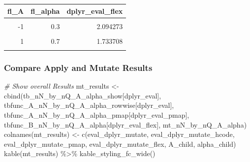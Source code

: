 \documentclass[
]{book}
\newenvironment{Shaded}{\begin{snugshade}}{\end{snugshade}}
\newcommand{\CommentTok}[1]{\textcolor[rgb]{0.56,0.35,0.01}{\textit{#1}}}
\newcommand{\FunctionTok}[1]{\textcolor[rgb]{0.00,0.00,0.00}{#1}}
\newcommand{\NormalTok}[1]{#1}
\newcommand{\OtherTok}[1]{\textcolor[rgb]{0.56,0.35,0.01}{#1}}
\newcommand{\SpecialCharTok}[1]{\textcolor[rgb]{0.00,0.00,0.00}{#1}}
\newcommand{\StringTok}[1]{\textcolor[rgb]{0.31,0.60,0.02}{#1}}
\begin{document}
\begin{table}[!h]
\centering
\begin{tabular}{r|r|r}
\hline
fl\_A & fl\_alpha & dplyr\_eval\_flex\\
\hline
\cellcolor{gray!6}{-2} & \cellcolor{gray!6}{0.1} & \cellcolor{gray!6}{2.346356}\\
\hline
-1 & 0.3 & 2.094273\\
\hline
\cellcolor{gray!6}{0} & \cellcolor{gray!6}{0.5} & \cellcolor{gray!6}{1.895316}\\
\hline
1 & 0.7 & 1.733708\\
\hline
\cellcolor{gray!6}{2} & \cellcolor{gray!6}{0.9} & \cellcolor{gray!6}{1.599477}\\
\hline
\end{tabular}
\end{table}

\hypertarget{compare-apply-and-mutate-results}{%
\subsubsection{Compare Apply and Mutate Results}\label{compare-apply-and-mutate-results}}

\begin{Shaded}
\begin{Highlighting}[]
\CommentTok{\# Show overall Results}
\NormalTok{mt\_results }\OtherTok{\textless{}{-}} \FunctionTok{cbind}\NormalTok{(tb\_nN\_by\_nQ\_A\_alpha\_show[}\StringTok{\textquotesingle{}dplyr\_eval\textquotesingle{}}\NormalTok{],}
\NormalTok{                    tbfunc\_A\_nN\_by\_nQ\_A\_alpha\_rowwise[}\StringTok{\textquotesingle{}dplyr\_eval\textquotesingle{}}\NormalTok{],}
\NormalTok{                    tbfunc\_A\_nN\_by\_nQ\_A\_alpha\_pmap[}\StringTok{\textquotesingle{}dplyr\_eval\_pmap\textquotesingle{}}\NormalTok{],}
\NormalTok{                    tbfunc\_B\_nN\_by\_nQ\_A\_alpha[}\StringTok{\textquotesingle{}dplyr\_eval\_flex\textquotesingle{}}\NormalTok{],}
\NormalTok{                    mt\_nN\_by\_nQ\_A\_alpha)}
\FunctionTok{colnames}\NormalTok{(mt\_results) }\OtherTok{\textless{}{-}} \FunctionTok{c}\NormalTok{(}\StringTok{\textquotesingle{}eval\_dplyr\_mutate\textquotesingle{}}\NormalTok{,}
                          \StringTok{\textquotesingle{}eval\_dplyr\_mutate\_hcode\textquotesingle{}}\NormalTok{,}
                          \StringTok{\textquotesingle{}eval\_dplyr\_mutate\_pmap\textquotesingle{}}\NormalTok{,}
                          \StringTok{\textquotesingle{}eval\_dplyr\_mutate\_flex\textquotesingle{}}\NormalTok{,}
                          \StringTok{\textquotesingle{}A\_child\textquotesingle{}}\NormalTok{, }\StringTok{\textquotesingle{}alpha\_child\textquotesingle{}}\NormalTok{)}
\FunctionTok{kable}\NormalTok{(mt\_results) }\SpecialCharTok{\%\textgreater{}\%}
  \FunctionTok{kable\_styling\_fc\_wide}\NormalTok{()}
\end{Highlighting}
\end{Shaded}
\end{document}

